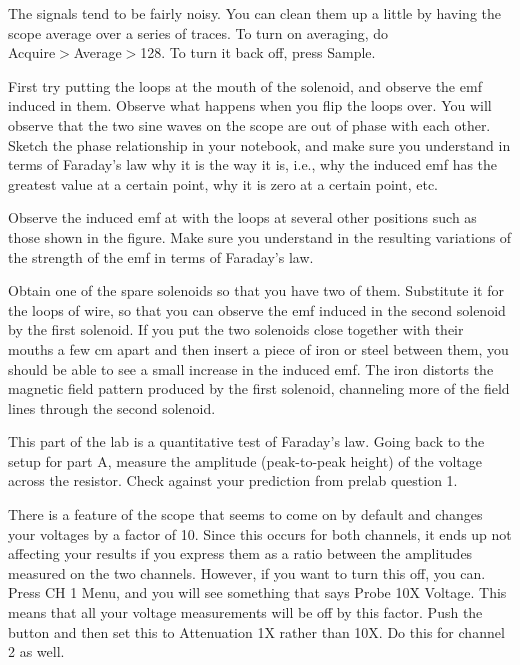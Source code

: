 The signals tend to be fairly noisy. You can clean them up
a little by having the scope average over a series of traces.
To turn on averaging, do\\
 Acquire$>$Average$>$128. To turn it back
off, press Sample.

First try putting the loops at the mouth of the solenoid,
and observe the emf induced in them. Observe what happens
when you flip the loops over. You will observe that the two
sine waves on the scope are out of phase with each other.
Sketch the phase relationship in your notebook, and make
sure you understand in terms of Faraday's law why it is the
way it is, i.e., why the induced emf has the greatest value
at a certain point, why it is zero at a certain point, etc.

Observe the induced emf at with the loops at several other
positions such as those shown in the figure. Make sure you
understand in the resulting variations of the strength of
the emf in terms of Faraday's law.


Obtain one of the spare solenoids so that you have two of
them. Substitute it for the loops of wire, so that you can
observe the emf induced in the second solenoid by the first
solenoid. If you put the two solenoids close together with
their mouths a few cm apart and then insert a piece of iron
or steel between them, you should be able to see a small
increase in the induced emf. The iron distorts the magnetic
field pattern produced by the first solenoid, channeling
more of the field lines through the second solenoid.


This part of the lab is a quantitative test of Faraday's
law. Going back to the setup for part A, measure the
amplitude (peak-to-peak height) of the voltage across the
resistor. Check against your prediction from prelab question 1.

There is a feature of the scope that seems to come on by
default and changes your voltages by a factor of 10. Since this
occurs for both channels, it ends up not affecting your results
if you express them as a ratio between the amplitudes measured
on the two channels. However, if you want to turn this off, you can.
Press CH 1 Menu, and you will see something that
says Probe 10X Voltage. This means that all your voltage measurements
will be off by this factor. Push the button and then set this to
Attenuation 1X rather than 10X. Do this for channel 2 as well.

